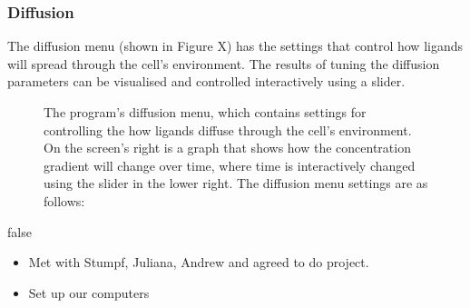 \documentclass[11.5pt]{article}
\begin{document}
\subsubsection{Diffusion}

The diffusion menu (shown in Figure X) has the settings that control how 
ligands will spread through the cell's environment. The results of 
tuning the diffusion parameters can be visualised and controlled 
interactively using a slider.

\begin{figure}[H]
\centering
\caption{The program's diffusion menu, which contains 
settings for controlling the how ligands diffuse through the cell's 
environment. On the screen's right is a graph that shows how the 
concentration gradient will change over time, where time is 
interactively changed using the slider in the lower right. The diffusion 
menu settings are as follows:}
\end{figure}
\if false
\begin{itemize}
 \item Met with Stumpf, Juliana, Andrew and agreed to do project.
 \item Set up our computers
\end{itemize}
\fi
\end{document}

